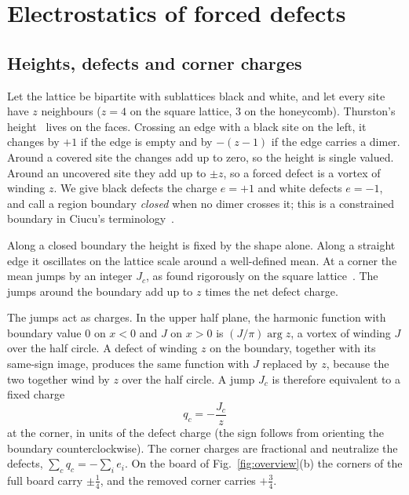 \documentclass[aps,pre,twocolumn,superscriptaddress,nofootinbib,floatfix]{revtex4-2}
\begin{document}
\section{Electrostatics of forced defects}
\label{sec:theory}
\subsection{Heights, defects and corner charges}
Let the lattice be bipartite with sublattices black and white, and let every site have $z$ neighbours ($z=4$ on the square lattice, $3$ on the honeycomb). Thurston's height~\cite{Thurston1990} lives on the faces. Crossing an edge with a black site on the left, it changes by $+1$ if the edge is empty and by $-(z-1)$ if the edge carries a dimer. Around a covered site the changes add up to zero, so the height is single valued. Around an uncovered site they add up to $\pm z$, so a forced defect is a vortex of winding $z$. We give black defects the charge $e=+1$ and white defects $e=-1$, and call a region boundary \emph{closed} when no dimer crosses it; this is a constrained boundary in Ciucu's terminology~\cite{Ciucu2015}.

Along a closed boundary the height is fixed by the shape alone. Along a straight edge it oscillates on the lattice scale around a well-defined mean. At a corner the mean jumps by an integer $J_c$, as found rigorously on the square lattice~\cite{Russkikh2018,BerestyckiLiu2023}. The jumps around the boundary add up to $z$ times the net defect charge.

The jumps act as charges. In the upper half plane, the harmonic function with boundary value $0$ on $x<0$ and $J$ on $x>0$ is $(J/\pi)\arg z$, a vortex of winding $J$ over the half circle. A defect of winding $z$ on the boundary, together with its same-sign image, produces the same function with $J$ replaced by $z$, because the two together wind by $z$ over the half circle. A jump $J_c$ is therefore equivalent to a fixed charge
\begin{equation}
q_c=-\frac{J_c}{z}
\label{eq:qc}
\end{equation}
at the corner, in units of the defect charge (the sign follows from orienting the boundary counterclockwise). The corner charges are fractional and neutralize the defects, $\sum_cq_c=-\sum_ie_i$. On the board of Fig.~\ref{fig:overview}(b) the corners of the full board carry $\pm\tfrac14$, and the removed corner carries $+\tfrac34$.
\end{document}
